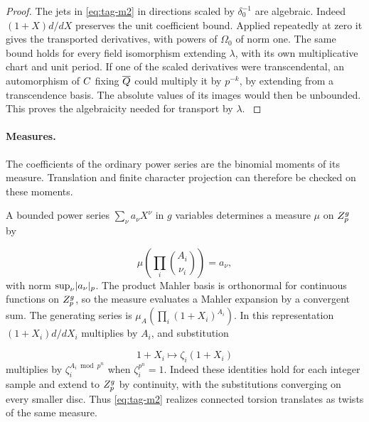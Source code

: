 \begin{proof}

The jets in \eqref{eq:tag-m2} in directions scaled by \(\delta_0^{-1}\)
are algebraic. Indeed \((1+X)d/dX\) preserves the unit
coefficient bound. Applied repeatedly at zero it gives the
transported derivatives, with powers of \(\Omega_0\) of norm
one. The same bound holds for every field isomorphism
extending \(\lambda\), with its own multiplicative chart and
unit period. If one of the scaled derivatives were
transcendental, an automorphism of \(C\) fixing
\(\overline{Q}\) could multiply it by \(p^{-k}\), by
extending from a transcendence basis. The absolute values
of its images would then be unbounded. This proves the
algebraicity needed for transport by \(\lambda\).
\label{cor:word-measure-3}

\end{proof}

\paragraph{Measures.}

The coefficients of the ordinary power series are the binomial moments of its measure. Translation and finite character projection can therefore be checked on these moments.

A bounded power series \(\sum_\nu a_\nu X^\nu\) in \(g\)
variables determines a measure \(\mu\) on \(Z_p^g\) by

\[
  \mu(\prod_i\binom{A_i}{\nu_i})=a_\nu,
\]
 with norm
\(\sup_\nu\lvert a_\nu\rvert_p\). The product Mahler basis is
orthonormal for continuous functions on \(Z_p^g\), so the
measure evaluates a Mahler expansion by a convergent sum.
The generating series is \(\mu_A(\prod_i(1+X_i)^{A_i})\).
In this representation \((1+X_i)d/dX_i\) multiplies by
\(A_i\), and substitution

\[
  1+X_i\mapsto\zeta_i(1+X_i)
\]
 multiplies by
\(\zeta_i^{A_i\bmod p^n}\) when \(\zeta_i^{p^n}=1\).
Indeed these identities hold for each integer sample and
extend to \(Z_p^g\) by continuity, with the substitutions
converging on every smaller disc. Thus \eqref{eq:tag-m2} realizes
connected torsion translates as twists of the same measure.
\cite{bannai-kobayashi-theta}\label{cor:word-measure-4}

